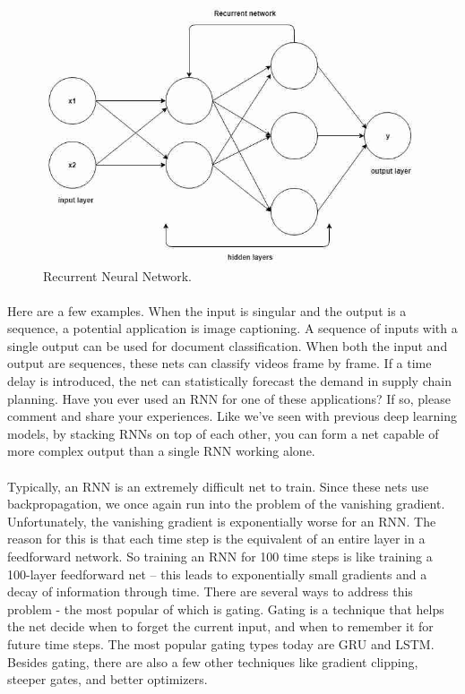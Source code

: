 \documentclass{article}
\begin{document}
    \begin{figure}[h!]
      \begin{center}
        \includegraphics[width=0.5\linewidth]{img/Recurrent.jpeg}
        \caption{Recurrent Neural Network.}
        \label{fig:snn}
      \end{center}
    \end{figure}
    
    \paragraph{}
    Here are a few examples. When the input is  singular and the output is a sequence, a potential  application is image captioning. A sequence  of inputs with a single output can be used  for document classification. When both the  input and output are sequences, these nets  can classify videos frame by frame. If a time  delay is introduced, the net can statistically  forecast the demand in supply chain planning.  Have you ever used an RNN for one of these  applications? If so, please comment and share  your experiences.  Like we’ve seen with previous deep learning  models, by stacking RNNs on top of each other,  you can form a net capable of more complex  output than a single RNN working alone.
    \paragraph{}
    Typically, an RNN is an extremely difficult  net to train. Since these nets use backpropagation,  we once again run into the problem of the  vanishing gradient. Unfortunately, the vanishing  gradient is exponentially worse for an RNN.  The reason for this is that each time step  is the equivalent of an entire layer in a  feedforward network. So training an RNN for  100 time steps is like training a 100-layer  feedforward net – this leads to exponentially  small gradients and a decay of information  through time.  There are several ways to address this problem  - the most popular of which is gating. Gating  is a technique that helps the net decide when  to forget the current input, and when to remember  it for future time steps. The most popular  gating types today are GRU and LSTM. Besides  gating, there are also a few other techniques  like gradient clipping, steeper gates, and  better optimizers.
\end{document}
